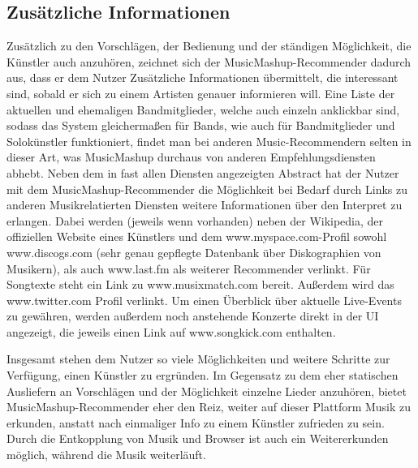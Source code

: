 \subsection{Zusätzliche Informationen}
Zusätzlich zu den Vorschlägen, der Bedienung und der ständigen Möglichkeit, die Künstler auch anzuhören, zeichnet sich der MusicMashup-Recommender dadurch aus, dass er dem Nutzer Zusätzliche Informationen übermittelt, die interessant sind, sobald er sich zu einem Artisten genauer informieren will. Eine Liste der aktuellen und ehemaligen Bandmitglieder, welche auch einzeln anklickbar sind, sodass das System gleichermaßen für Bands, wie auch für Bandmitglieder und Solokünstler funktioniert, findet man bei anderen Music-Recommendern selten in dieser Art, was MusicMashup durchaus von anderen Empfehlungsdiensten abhebt. 
Neben dem in fast allen Diensten angezeigten Abstract hat der Nutzer mit dem MusicMashup-Recommender die Möglichkeit bei Bedarf durch Links zu anderen Musikrelatierten Diensten weitere Informationen über den Interpret zu erlangen. Dabei werden (jeweils wenn vorhanden) neben der Wikipedia, der offiziellen Website eines Künstlers und dem www.myspace.com-Profil sowohl www.discogs.com (sehr genau gepflegte Datenbank über Diskographien von Musikern), als auch www.last.fm als weiterer Recommender verlinkt. Für Songtexte steht ein Link zu www.musixmatch.com bereit. Außerdem wird das www.twitter.com Profil verlinkt. Um einen Überblick über aktuelle Live-Events zu gewähren, werden außerdem noch anstehende Konzerte direkt in der UI angezeigt, die jeweils einen Link auf www.songkick.com enthalten.


Insgesamt stehen dem Nutzer so viele Möglichkeiten und weitere Schritte zur Verfügung, einen Künstler zu ergründen. Im Gegensatz zu dem eher statischen Ausliefern an Vorschlägen und der Möglichkeit einzelne Lieder anzuhören, bietet MusicMashup-Recommender eher den Reiz, weiter auf dieser Plattform Musik zu erkunden, anstatt nach einmaliger Info zu einem Künstler zufrieden zu sein. Durch die Entkopplung von Musik und Browser ist auch ein Weitererkunden möglich, während die Musik weiterläuft.


